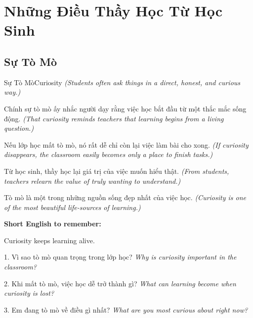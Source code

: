 \chapter{Những Điều Thầy Học Từ Học Sinh}

\section{Sự Tò Mò}
\begin{truyen}{Sự Tò Mò}{Curiosity}
\textit{(Students often ask things in a direct, honest, and curious way.)}

Chính sự tò mò ấy nhắc người dạy rằng việc học bắt đầu từ một thắc mắc sống động.
\textit{(That curiosity reminds teachers that learning begins from a living question.)}

Nếu lớp học mất tò mò, nó rất dễ chỉ còn lại việc làm bài cho xong.
\textit{(If curiosity disappears, the classroom easily becomes only a place to finish tasks.)}

Từ học sinh, thầy học lại giá trị của việc muốn hiểu thật.
\textit{(From students, teachers relearn the value of truly wanting to understand.)}
\end{truyen}

\begin{baihoc}
Tò mò là một trong những nguồn sống đẹp nhất của việc học.
\textit{(Curiosity is one of the most beautiful life-sources of learning.)}
\end{baihoc}

\begin{ghinhoanh}
\textbf{Short English to remember:}

Curiosity keeps learning alive.

\end{ghinhoanh}

\begin{tuhocnhanh}
1. Vì sao tò mò quan trọng trong lớp học? \textit{Why is curiosity important in the classroom?}

2. Khi mất tò mò, việc học dễ trở thành gì? \textit{What can learning become when curiosity is lost?}

3. Em đang tò mò về điều gì nhất? \textit{What are you most curious about right now?}
\end{tuhocnhanh}
\ngancach

